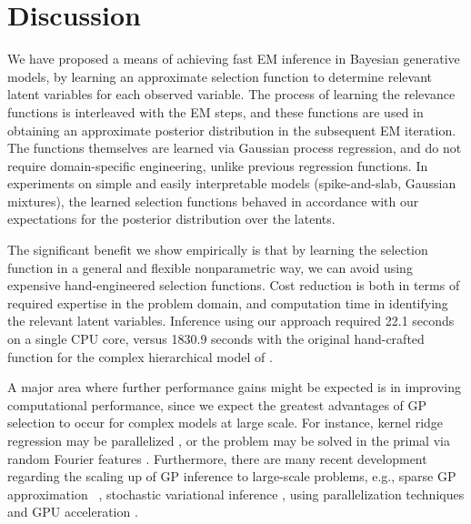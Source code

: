 \section{Discussion}
%
We have proposed a means of achieving fast EM inference in Bayesian generative models, by
learning an approximate selection function to determine relevant latent variables
for each observed variable. The process of learning the relevance functions
is interleaved with the EM steps, and these functions
are used in obtaining an approximate posterior distribution in the subsequent EM iteration.
The functions themselves are learned via Gaussian process regression,
and do not require domain-specific engineering, unlike previous regression functions.
In experiments on simple and easily interpretable models (spike-and-slab, Gaussian mixtures),
the learned selection functions behaved in accordance with our expectations for the posterior
distribution over the latents.  

The significant benefit we show empirically is that by learning the selection function in a general and flexible nonparametric way, we can avoid using expensive hand-engineered selection functions.
Cost reduction is both in terms of required expertise in the problem domain, and computation time in identifying the relevant latent variables.
Inference using our approach required 22.1 seconds on a single CPU core, versus  1830.9 seconds with the original hand-crafted function 
for the complex hierarchical model of \citep{DaiLucke2014}. 

A major area where further performance gains might be expected is in
improving computational performance, since we expect the greatest
advantages of GP selection to occur for complex models at large scale. For instance,
 kernel ridge regression
may be parallelized \citep{zhang14divide},
or the problem may be solved in the primal via random Fourier features \citep{LeSarSmo13}.
Furthermore, there are many recent development regarding the scaling up of GP inference to large-scale problems, e.g., sparse GP approximation
~\citep{sparseGP}, stochastic variational inference \citep{HensmanEtAl2013,Hensman2012}, using parallelization techniques and GPU acceleration \citep{butt}.

